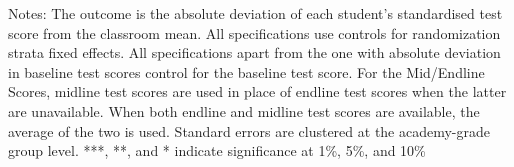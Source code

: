 \begin{table}[!h]
\begin{threeparttable}
\begin{tabular}[t]{lccccccccclcc}
\hline
\bottomrule
\end{tabular}
\begin{tablenotes}[para]
\item Notes: The outcome is the absolute deviation of each student's standardised test score from the classroom mean. All specifications use controls for randomization strata fixed effects. All specifications apart from the one with absolute deviation in baseline test scores control for the baseline test score. For the Mid/Endline Scores, midline test scores are used in place of endline test scores when the latter are unavailable. When both endline and midline test scores are available, the average of the two is used. Standard errors are clustered at the academy-grade group level. ***, **, and * indicate significance at 1\%, 5\%, and 10\%
\end{tablenotes}
\end{threeparttable}
\end{table}
